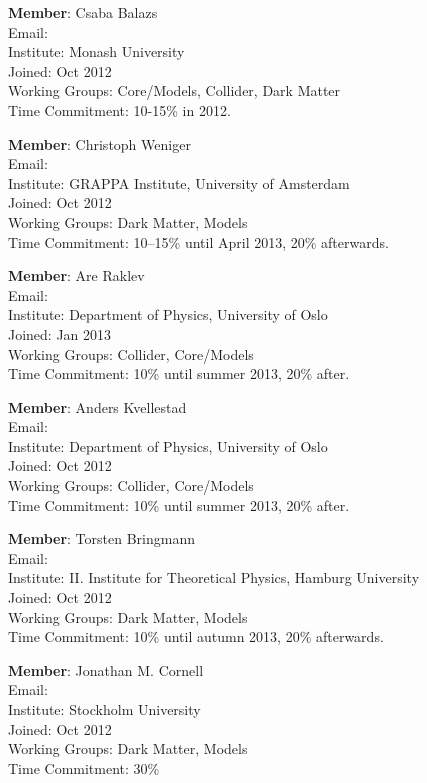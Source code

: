 \textbf{Member}: Csaba Balazs\\
Email: \\
Institute: Monash University\\
Joined: Oct 2012\\
Working Groups: Core/Models, Collider, Dark Matter\\
Time Commitment: 10-15\% in 2012. 

\textbf{Member}: Christoph Weniger\\
Email: \\
Institute: GRAPPA Institute, University of Amsterdam\\
Joined: Oct 2012\\
Working Groups: Dark Matter, Models\\
Time Commitment: 10--15\% until April 2013, 20\% afterwards.

\textbf{Member}: Are Raklev\\
Email: \\
Institute: Department of Physics, University of Oslo\\
Joined: Jan 2013\\
Working Groups: Collider, Core/Models\\
Time Commitment: 10\% until summer 2013, 20\% after.

\textbf{Member}: Anders Kvellestad\\
Email: \\
Institute: Department of Physics, University of Oslo\\
Joined: Oct 2012\\
Working Groups: Collider, Core/Models\\
Time Commitment: 10\% until summer 2013, 20\% after.

\textbf{Member}: Torsten Bringmann\\
Email: \\
Institute: II. Institute for Theoretical Physics, Hamburg University\\
Joined: Oct 2012\\
Working Groups: Dark Matter, Models\\
Time Commitment: 10\% until autumn 2013, 20\% afterwards.

\textbf{Member}: Jonathan M. Cornell\\
Email: \\
Institute: Stockholm University\\
Joined: Oct 2012\\
Working Groups: Dark Matter, Models\\
Time Commitment: 30\%

